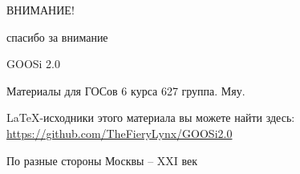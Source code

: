 \begingroup
    \centerline{ВНИМАНИЕ!}
    \centerline{спасибо за внимание}
    \centerline{\hfill\hrulefill\hrulefill\hfill}
    \vskip1.5cm
    \centerline{GOOSi 2.0}
    \centerline{Материалы для ГОСов 6 курса 627 группа. Мяу.}
    \vskip1.5cm
    
    LaTeX-исходники этого материала вы можете найти здесь: \url{https://github.com/TheFieryLynx/GOOSi2.0}

    \bigbreak
    \bigbreak
    \bigbreak
    \bigbreak
    \bigbreak

    \vfill
    \centerline{По разные стороны Москвы -- XXI век}
\endgroup
